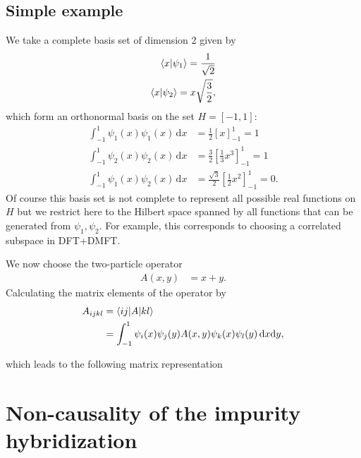\documentclass[12pt,a4paper]{scrartcl}
\numberwithin{equation}{section}
\begin{document}
\subsection{Simple example}
We take a complete basis set of dimension 2 given by
\begin{align}
 \braket{x | \psi_1 } = \frac{1}{\sqrt{2}} \\
 \braket{x | \psi_2 } = x\sqrt{\frac{3}{2}}, 
\end{align}
which form an orthonormal basis on the set $H= [-1,1]$:
\begin{align}
 \int_{-1}^{1} \psi_1(x)\psi_1(x) \, \mathrm{d}x
 &= \frac{1}{2} [ x ]_{-1}^1 = 1 \\
%
 \int_{-1}^{1} \psi_2(x)\psi_2(x) \, \mathrm{d}x
 &= \frac{3}{2} \left[\frac{1}{3} x^3 \right]_{-1}^1 = 1 \\
%
 \int_{-1}^{1} \psi_1(x)\psi_2(x) \, \mathrm{d}x
 &= \frac{\sqrt{3}}{2} \left[\frac{1}{2}x^2 \right]_{-1}^1 = 0 .
\end{align}
Of course this basis set is not complete to represent
all possible real functions on $H$ but we restrict here to 
the Hilbert space spanned by all functions that 
can be generated from $\psi_1,\psi_2$. For example, this corresponds
to choosing a correlated subspace in DFT+DMFT.

We now choose the two-particle operator
\begin{align}
A(x,y) &= x+y.
\end{align}
Calculating the matrix elements of the operator by
\begin{align}
 A_{ijkl} &= \braket{ij|A|kl} \\
 &= \int_{-1}^{1} \psi_i(x) \psi_j(y) A(x,y) \psi_k(x) \psi_l(y) \, \mathrm{d}x\mathrm{d}y,
\end{align}

which leads to the following matrix representation



\section{Non-causality of the impurity hybridization}
\label{sec:noncausal_hyb}
\end{document}
